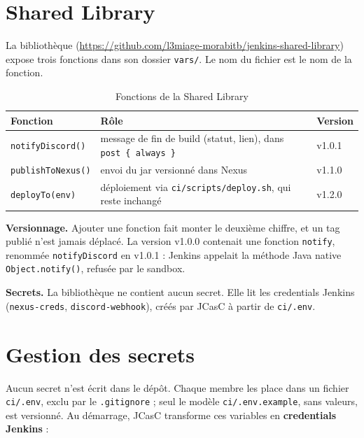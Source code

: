 \documentclass[11pt,a4paper]{report}
\begin{document}
\section{Shared Library}
La bibliothèque (\url{https://github.com/l3miage-morabitb/jenkins-shared-library}) expose trois fonctions dans son dossier \texttt{vars/}. Le nom du fichier est le nom de la fonction.

\begin{table}[H]
  \centering
  \small
  \begin{tabularx}{\textwidth}{@{}L{3.6cm}YL{1.6cm}@{}}
    \toprule
    \textbf{Fonction} & \textbf{Rôle} & \textbf{Version} \\
    \midrule
    \texttt{notifyDiscord()} & message de fin de build (statut, lien), dans \texttt{post \{ always \}} & v1.0.1 \\
    \texttt{publishToNexus()} & envoi du jar versionné dans Nexus & v1.1.0 \\
    \texttt{deployTo(env)} & déploiement via \texttt{ci/scripts/deploy.sh}, qui reste inchangé & v1.2.0 \\
    \bottomrule
  \end{tabularx}
  \caption{Fonctions de la Shared Library}
\end{table}

\textbf{Versionnage.} Ajouter une fonction fait monter le deuxième chiffre, et un tag publié n'est jamais déplacé. La version v1.0.0 contenait une fonction \texttt{notify}, renommée \texttt{notifyDiscord} en v1.0.1 : Jenkins appelait la méthode Java native \texttt{Object.notify()}, refusée par le sandbox.

\textbf{Secrets.} La bibliothèque ne contient aucun secret. Elle lit les credentials Jenkins (\texttt{nexus-creds}, \texttt{discord-webhook}), créés par JCasC à partir de \texttt{ci/.env}.

\section{Gestion des secrets}
Aucun secret n'est écrit dans le dépôt. Chaque membre les place dans un fichier \texttt{ci/.env}, exclu par le \texttt{.gitignore} ; seul le modèle \texttt{ci/.env.example}, sans valeurs, est versionné. Au démarrage, JCasC transforme ces variables en \textbf{credentials Jenkins} :
\end{document}
